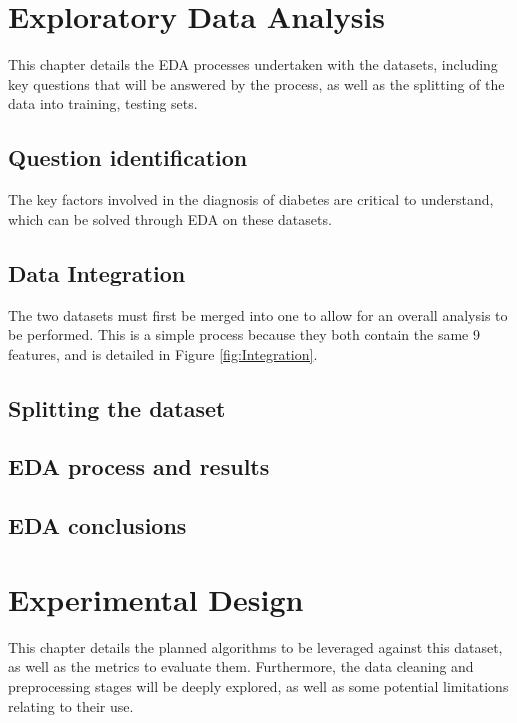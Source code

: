 \documentclass[12pt]{report}
\begin{document}
\chapter{Exploratory Data Analysis}
This chapter details the EDA processes undertaken with the datasets, including 
key questions that will be answered by the process, as well as the splitting of the 
data into training, testing %
sets.

\section{Question identification}
The key factors involved in the diagnosis of diabetes are critical to understand, which 
can be solved through EDA on these datasets. 

\section{Data Integration}
The two datasets must first be merged into one to allow for an overall analysis to be performed.
This is a simple process because they both contain the same 9 features, and is detailed in Figure 
\ref{fig:Integration}.


\section{Splitting the dataset}

\section{EDA process and results}


\section{EDA conclusions}


\chapter{Experimental Design} %
This chapter details the planned algorithms to be leveraged against this dataset,
as well as the metrics to evaluate them. Furthermore, the data cleaning and preprocessing 
stages will be deeply explored, as well as some potential limitations relating to their use.
\end{document}
